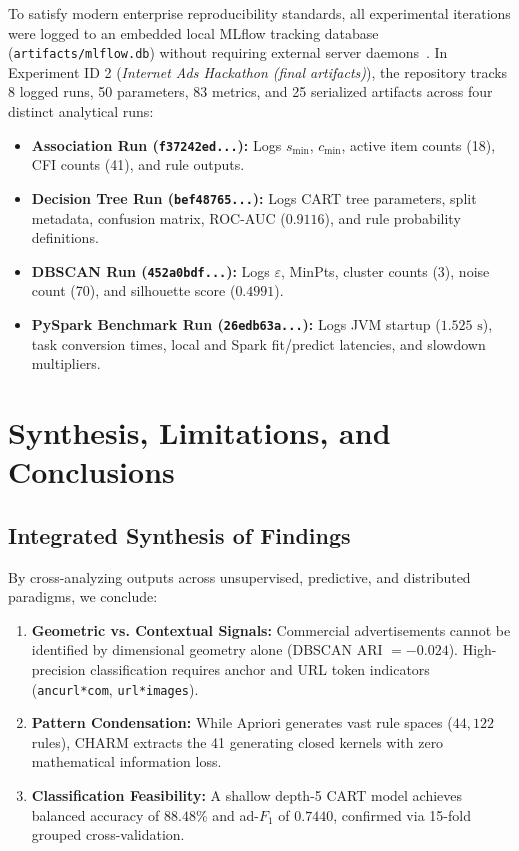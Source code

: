 \documentclass[11pt,a4paper]{article}
\begin{document}
To satisfy modern enterprise reproducibility standards, all experimental iterations were logged to an embedded local MLflow tracking database (\texttt{artifacts/mlflow.db}) without requiring external server daemons~\cite{mlflow2024}.
In Experiment ID 2 (\textit{Internet Ads Hackathon (final artifacts)}), the repository tracks 8 logged runs, 50 parameters, 83 metrics, and 25 serialized artifacts across four distinct analytical runs:
\begin{itemize}[noitemsep,topsep=2pt]
    \item \textbf{Association Run (\texttt{f37242ed...}):} Logs $s_{\min}$, $c_{\min}$, active item counts (18), CFI counts (41), and rule outputs.
    \item \textbf{Decision Tree Run (\texttt{bef48765...}):} Logs CART tree parameters, split metadata, confusion matrix, ROC-AUC ($0.9116$), and rule probability definitions.
    \item \textbf{DBSCAN Run (\texttt{452a0bdf...}):} Logs $\varepsilon$, MinPts, cluster counts (3), noise count (70), and silhouette score ($0.4991$).
    \item \textbf{PySpark Benchmark Run (\texttt{26edb63a...}):} Logs JVM startup ($1.525\text{ s}$), task conversion times, local and Spark fit/predict latencies, and slowdown multipliers.
\end{itemize}

\section{Synthesis, Limitations, and Conclusions}
\label{sec:conclusions}

\subsection{Integrated Synthesis of Findings}
By cross-analyzing outputs across unsupervised, predictive, and distributed paradigms, we conclude:
\begin{enumerate}[noitemsep,topsep=2pt]
    \item \textbf{Geometric vs. Contextual Signals:} Commercial advertisements cannot be identified by dimensional geometry alone (DBSCAN ARI $= -0.024$). High-precision classification requires anchor and URL token indicators (\texttt{ancurl*com}, \texttt{url*images}).
    \item \textbf{Pattern Condensation:} While Apriori generates vast rule spaces ($44{,}122$ rules), CHARM extracts the 41 generating closed kernels with zero mathematical information loss.
    \item \textbf{Classification Feasibility:} A shallow depth-5 CART model achieves balanced accuracy of $88.48\%$ and ad-$F_1$ of $0.7440$, confirmed via 15-fold grouped cross-validation.
\end{enumerate}
\end{document}
